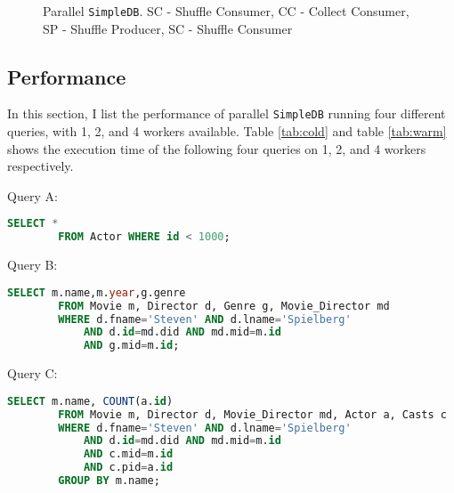 \documentclass[12pt]{myland}
\def\<#1>{\texttt{#1}}
\begin{document}
\begin{figure}[t!]
        \caption{Parallel \<SimpleDB>. SC - Shuffle Consumer, CC - Collect Consumer, SP - Shuffle Producer, SC - Shuffle
        Consumer}
        \label{fig:para}
    \end{figure}

    \subsection{Performance}
    In this section, I list the performance of parallel \<SimpleDB> running four different queries, with 1, 2, and 4
    workers available. Table \ref{tab:cold} and table \ref{tab:warm} shows the execution time of the following four
    queries on 1, 2, and 4 workers respectively.

    Query A:
    \begin{lstlisting}[language=SQL]
    SELECT *
        FROM Actor WHERE id < 1000;
    \end{lstlisting}

    Query B:
    \begin{lstlisting}[language=SQL]
    SELECT m.name,m.year,g.genre
        FROM Movie m, Director d, Genre g, Movie_Director md
        WHERE d.fname='Steven' AND d.lname='Spielberg'
            AND d.id=md.did AND md.mid=m.id
            AND g.mid=m.id;
    \end{lstlisting}

    Query C:
    \begin{lstlisting}[language=SQL]
    SELECT m.name, COUNT(a.id)
        FROM Movie m, Director d, Movie_Director md, Actor a, Casts c
        WHERE d.fname='Steven' AND d.lname='Spielberg'
            AND d.id=md.did AND md.mid=m.id
            AND c.mid=m.id
            AND c.pid=a.id
        GROUP BY m.name;
    \end{lstlisting}
\end{document}
